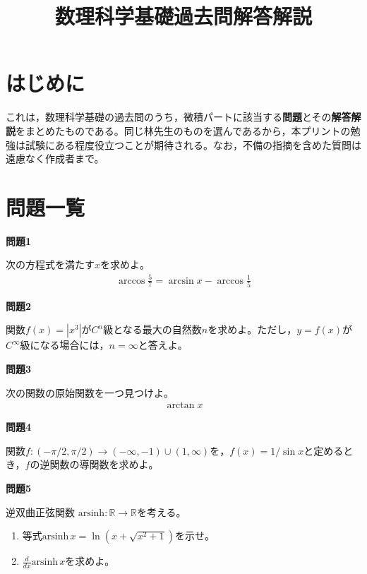 \documentclass[a4paper,12pt,dvipdfmx,fleqn, oneside]{jsarticle}
\title{数理科学基礎過去問解答解説}
\author{}
\date{}
\theoremstyle{defstyle}
\theoremstyle{thmx}
\theoremstyle{qesstyle}
\begin{document}
\setlength{\abovedisplayskip}{4pt}
\setlength{\belowdisplayskip}{4pt}
\maketitle

\section*{はじめに}
これは，数理科学基礎の過去問のうち，微積パートに該当する\textbf{問題}とその\textbf{解答解説}をまとめたものである。同じ林先生のものを選んであるから，本プリントの勉強は試験にある程度役立つことが期待される。なお，不備の指摘を含めた質問は遠慮なく作成者まで。
\section*{問題一覧}
\begin{shadebox}
    \textbf{問題1}

    次の方程式を満たす$x$を求めよ。
    \begin{align*}
        \arccos \frac{5}{7} = \arcsin x- \arccos \frac{1}{5}
    \end{align*}
\end{shadebox}
\begin{shadebox}
    \textbf{問題2}

    関数$f(x)=\left|x^3\right|$が$C^n$級となる最大の自然数$n$を求めよ。ただし，$y=f(x)$が$C^{\infty}$級になる場合には，$n=\infty$と答えよ。
\end{shadebox}
\begin{shadebox}
    \textbf{問題3}

    次の関数の原始関数を一つ見つけよ。
    \begin{align*}
        \arctan x
    \end{align*}
\end{shadebox}
\begin{shadebox}
    \textbf{問題4}

    関数$f:(-\pi/ 2, \pi / 2) \rightarrow (- \infty , -1) \cup (1, \infty)$を，$f(x)=1/\sin x$と定めるとき，$f$の逆関数の導関数を求めよ。
\end{shadebox}
\begin{shadebox}
    \textbf{問題5}

    逆双曲正弦関数 $\text{arsinh} : \mathbb{R} \rightarrow \mathbb{R}$を考える。
    \begin{enumerate}
        \item 等式$\text{arsinh}\, x = \ln(x+\sqrt{x^2+1})$を示せ。
        \item $\frac{d}{dx} \text{arsinh} \, x$を求めよ。
    \end{enumerate}
\end{shadebox}
\end{document}
